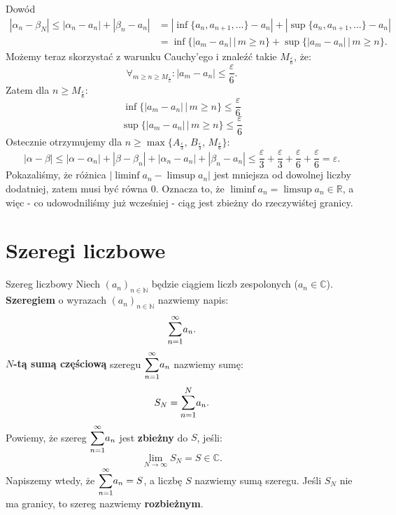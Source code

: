 \documentclass{article}
\numberwithin{defi}{section}
\numberwithin{defi}{section}
\newcommand{\R}{\mathbb{R}}
\newcommand{\N}{\mathbb{N}}
\newcommand{\C}{\mathbb{C}}
\newcommand{\oo}{\infty}
\providecommand{\eps}{\varepsilon}
\newcommand{\bsum}[2]{\mathlarger{\sum_{#1}^{#2}}}
\newcommand{\szerI}[1]{\bsum{n=1}{\oo} #1_n}
\newcommand{\ciag}[1]{(#1_{n})_{n \in \N}}
\newcommand{\gras}[2]{\lim_{#1 \to \oo} #2_{#1}}
\begin{document}
\begin{dow}{Dowód}
\begin{equation}
\begin{split}
            |\alpha_n - \beta_N| \leqslant |\alpha_n - a_n| + |\beta_n - a_n| & = |\inf\{a_n, a_{n+1}, ...\} - a_n| + |\sup\{a_n, a_{n+1}, ...\} - a_n| \\
            & = \inf\{ |a_m - a_n| \, \big| \, m \geqslant n \} + \sup\{ |a_m - a_n| \, \big| \, m \geqslant n \}.
        \end{split} \end{equation}
    Możemy teraz skorzystać z warunku Cauchy'ego i znaleźć takie $M_{\frac{\eps}{6}}$, że: \begin{equation}
        \forall_{m \geqslant n \geqslant M_{\frac{\eps}{6}}}: |a_m - a_n| \leqslant \frac{\eps}{6}.
    \end{equation} Zatem dla $n \geqslant M_{\frac{\eps}{6}}$:\begin{equation}
        \inf\{ |a_m - a_n| \, \big| \, m \geqslant n \} \leqslant \frac{\eps}{6}
    \end{equation} \begin{equation}
        \sup\{ |a_m - a_n| \, \big| \, m \geqslant n \} \leqslant \frac{\eps}{6}
    \end{equation}
    Ostecznie otrzymujemy dla $n \geqslant \max \{A_{\frac{\eps}{3}}, \, B_{\frac{\eps}{3}}, \, M_{\frac{\eps}{6}}\}$: \begin{equation}
        |\alpha - \beta| \leqslant |\alpha - \alpha_n| + |\beta - \beta_n| +  |\alpha_n - a_n| + |\beta_n - a_n| \leqslant \frac{\eps}{3} + \frac{\eps}{3} + \frac{\eps}{6} + \frac{\eps}{6} = \eps.
    \end{equation}
    Pokazaliśmy, że różnica $|\liminf a_n - \limsup a_n|$ jest mniejsza od dowolnej liczby dodatniej, zatem musi być równa $0$. Oznacza to, że $\liminf a_n = \limsup a_n \in \R$, a więc - co udowodniliśmy już wcześniej - ciąg jest zbieżny do rzeczywiśtej granicy.
\end{dow}



\newpage
\section{Szeregi liczbowe}
\begin{defr}{Szereg liczbowy}
    Niech $\ciag{a}$ będzie ciągiem liczb zespolonych ($a_n \in \C$). \textbf{Szeregiem} o wyrazach $\ciag{a}$ nazwiemy napis: \begin{equation}
        \bsum{n=1}{\oo} a_n.
    \end{equation} \textbf{$N$-tą sumą częściową} szeregu $\szerI{a}$ nazwiemy sumę: \begin{equation}
        S_N = \bsum{n=1}{N} a_n.
    \end{equation} Powiemy, że szereg $\szerI{a}$ jest \textbf{zbieżny} do $S$, jeśli: \begin{equation}
        \gras{N}{S} = S \in \C.
    \end{equation} Napiszemy wtedy, że $\szerI{a} = S$, a liczbę $S$ nazwiemy sumą szeregu. Jeśli $S_N$ nie ma granicy, to szereg nazwiemy \textbf{rozbieżnym}.
\end{defr}
\end{document}
